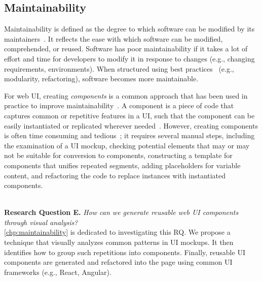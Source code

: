 \subsection{Maintainability} \label{subsec:maintainability}
Maintainability is defined as the degree to which software can be modified by its maintainers~\cite{iso25010, ebeling2019introduction}. 
It reflects the ease with which software can be modified, comprehended, or reused. 
Software has poor maintainability if it takes a lot of effort and time for developers to 
modify it in response to changes (e.g., changing requirements, environments). When structured using best practices~\cite{hegedHus2018empirical,frantz2019ranking} (e.g., modularity, refactoring), 
software becomes more maintainable.
 
For web UI, creating \emph{components} is a common approach  
that has been used in practice to improve maintainability~\cite{StateOfJS:WebPlatformTests}. 
A component is a piece of code that captures common or repetitive features 
in a UI, such that the component can be easily instantiated or replicated wherever 
needed~\cite{Angular_components}. 
However, creating components is often time consuming and tedious~\cite{thinking:in:components}; 
it requires several manual steps, including the examination of a UI mockup, 
checking potential elements that may or may not be suitable for conversion to 
components, constructing a template for components that unifies repeated segments,
adding placeholders for variable content, and refactoring the code
to replace instances with instantiated components. 
   
\ \\ 
\textbf{Research Question E.}
\textit{How can we generate reusable web UI components through visual analysis?
}
\\ 
\autoref{chp:maintainability} is dedicated to investigating this RQ. We propose 
a technique that visually analyzes common patterns in UI mockups. It then identifies 
how to group such repetitions into components. Finally, reusable UI components are 
generated and refactored into the page using common UI frameworks 
(e.g., React, Angular).  









%

